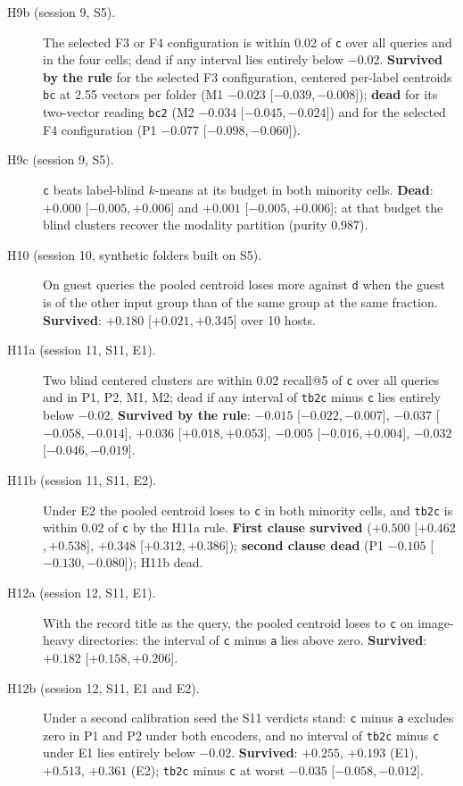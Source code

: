 \documentclass[11pt]{article}
\newcommand{\rep}[1]{\texttt{#1}}
\newcommand{\ci}[2]{[\ensuremath{#1},\,\ensuremath{#2}]}  %
\begin{document}
\begin{description}
\item[H9b (session 9, S5).] The selected F3 or F4 configuration is within 0.02 of \rep{c} over all queries and in the four cells; dead if any interval lies entirely below $-0.02$. \textbf{Survived by the rule} for the selected F3 configuration, centered per-label centroids \rep{bc} at 2.55 vectors per folder (M1 $-0.023$ \ci{-0.039}{-0.008}); \textbf{dead} for its two-vector reading \rep{bc2} (M2 $-0.034$ \ci{-0.045}{-0.024}) and for the selected F4 configuration (P1 $-0.077$ \ci{-0.098}{-0.060}).
\item[H9c (session 9, S5).] \rep{c} beats label-blind $k$-means at its budget in both minority cells. \textbf{Dead}: $+0.000$ \ci{-0.005}{+0.006} and $+0.001$ \ci{-0.005}{+0.006}; at that budget the blind clusters recover the modality partition (purity 0.987).
\item[H10 (session 10, synthetic folders built on S5).] On guest queries the pooled centroid loses more against \rep{d} when the guest is of the other input group than of the same group at the same fraction. \textbf{Survived}: $+0.180$ \ci{+0.021}{+0.345} over 10 hosts.
\item[H11a (session 11, S11, E1).] Two blind centered clusters are within 0.02 recall@5 of \rep{c} over all queries and in P1, P2, M1, M2; dead if any interval of \rep{tb2c} minus \rep{c} lies entirely below $-0.02$. \textbf{Survived by the rule}: $-0.015$ \ci{-0.022}{-0.007}, $-0.037$ \ci{-0.058}{-0.014}, $+0.036$ \ci{+0.018}{+0.053}, $-0.005$ \ci{-0.016}{+0.004}, $-0.032$ \ci{-0.046}{-0.019}.
\item[H11b (session 11, S11, E2).] Under E2 the pooled centroid loses to \rep{c} in both minority cells, and \rep{tb2c} is within 0.02 of \rep{c} by the H11a rule. \textbf{First clause survived} ($+0.500$ \ci{+0.462}{+0.538}, $+0.348$ \ci{+0.312}{+0.386}); \textbf{second clause dead} (P1 $-0.105$ \ci{-0.130}{-0.080}); H11b dead.
\item[H12a (session 12, S11, E1).] With the record title as the query, the pooled centroid loses to \rep{c} on image-heavy directories: the interval of \rep{c} minus \rep{a} lies above zero. \textbf{Survived}: $+0.182$ \ci{+0.158}{+0.206}.
\item[H12b (session 12, S11, E1 and E2).] Under a second calibration seed the S11 verdicts stand: \rep{c} minus \rep{a} excludes zero in P1 and P2 under both encoders, and no interval of \rep{tb2c} minus \rep{c} under E1 lies entirely below $-0.02$. \textbf{Survived}: $+0.255$, $+0.193$ (E1), $+0.513$, $+0.361$ (E2); \rep{tb2c} minus \rep{c} at worst $-0.035$ \ci{-0.058}{-0.012}.

\end{description}
\end{document}
